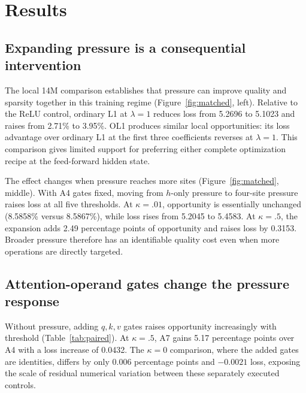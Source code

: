 \section{Results}
\label{sec:results}
\subsection{Expanding pressure is a consequential intervention}
\label{sec:pressure-results}
The local 14M comparison establishes that pressure can improve quality and
sparsity together in this training regime (Figure~\ref{fig:matched}, left).
Relative to the ReLU control, ordinary L1 at $\lambda=1$ reduces loss from
5.2696 to 5.1023 and raises \Rmodel{} from 2.71\% to 3.95\%.
OL1 produces similar local opportunities: its loss advantage over ordinary
L1 at the first three coefficients reverses at $\lambda=1$.
This comparison gives limited support for preferring either complete
optimization recipe at the feed-forward hidden state.

The effect changes when pressure reaches more sites
(Figure~\ref{fig:matched}, middle). With A4 gates fixed, moving from $h$-only
pressure to four-site pressure raises loss at all five thresholds.
At $\kappa=.01$, opportunity is essentially unchanged
(8.5858\% versus 8.5867\%), while loss rises from 5.2045 to 5.4583.
At $\kappa=.5$, the expansion adds 2.49 percentage points of opportunity
and raises loss by 0.3153. Broader pressure therefore has an identifiable
quality cost even when more operations are directly targeted.

\subsection{Attention-operand gates change the pressure response}
\label{sec:attention-results}
Without pressure, adding $q,k,v$ gates raises opportunity increasingly with
threshold (Table~\ref{tab:paired}). At $\kappa=.5$, A7 gains 5.17 percentage
points over A4 with a loss increase of 0.0432. The $\kappa=0$ comparison,
where the added gates are identities, differs by only 0.006 percentage points
and $-0.0021$ loss, exposing the scale of residual numerical variation
between these separately executed controls.

\begin{table}[t]
\centering
\caption{Matched 14M effects: child minus parent at the same threshold.
The first pair of columns is A7 minus A4 without pressure; the other
columns add OL1 at each configuration's respective sites. Positive
$\Delta R$ means more model-wide opportunity; negative
$\Delta\mathcal{L}$ means lower loss. The columns evaluate different
interventions under one seed.}
\label{tab:paired}
\small

\end{table}

